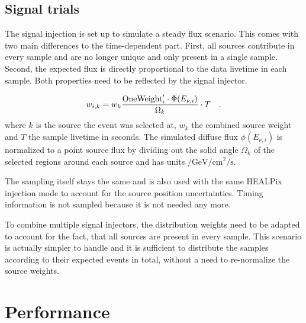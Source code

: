 

\subsection*{Signal trials}
The signal injection is set up to simulate a steady flux scenario.
This comes with two main differences to the time-dependent part.
First, all sources contribute in every sample and are no longer unique and only present in a single sample.
Second, the expected flux is directly proportional to the data livetime in each sample.
Both properties need to be reflected by the signal injector.

\begin{equation}
  w_{i,k} = w_k \frac{\text{OneWeight}'_i \cdot
    \Phi(E_{\nu,i})}{\Omega_k} \cdot T
  \quad\text{.}
\end{equation}
where $k$ is the source the event was selected at, $w_k$ the combined source weight and $T$ the sample livetime in seconds.
The simulated diffuse flux $\phi(E_{\nu,i})$ is normalized to a point source flux by dividing out the solid angle $\Omega_k$ of the selected regions around each source and has units $\si{\per\GeV\per\cm\squared\per\second}$.

The sampling itself stays the same and is also used with the same HEALPix injection mode to account for the source position uncertainties.
Timing information is not sampled because it is not needed any more.

To combine multiple signal injectors, the distribution weights need to be adapted to account for the fact, that all sources are present in every sample.
This scenario is actually simpler to handle and it is sufficient to distribute the samples according to their expected events in total, without a need to re-normalize the source weights.


\section{Performance}


